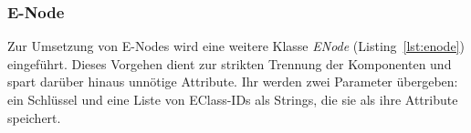 

\subsubsection{E-Node}

Zur Umsetzung von E-Nodes wird eine weitere Klasse \textit{ENode} (Listing~\ref{lst:enode}) eingeführt. Dieses Vorgehen dient zur strikten Trennung der Komponenten und 
spart darüber hinaus unnötige Attribute.
Ihr werden zwei Parameter übergeben: ein Schlüssel und eine Liste von EClass-IDs als Strings, die sie als ihre Attribute speichert.


